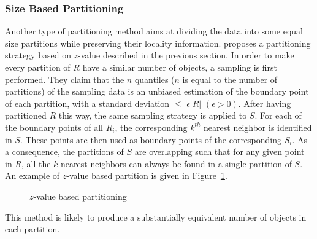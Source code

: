 \subsubsection{Size Based Partitioning} 

Another type of partitioning method aims at dividing the data into some equal size partitions while preserving their locality 
information. \cite{Zhang:2012:EPK:2247596.2247602} proposes a partitioning strategy based on $z$-value described in the 
previous section. 
In 
order to make every partition of $R$ have a similar number of objects, a sampling is first performed. They claim that the $n$ quantiles 
($n$ is equal to the number of partitions) of the sampling data is an unbiased estimation of the boundary point of each partition, with a
standard deviation $\leq$ $\epsilon\left|R\right|$ $\left( \epsilon > 0\right)$.
After having partitioned $R$ this way, the same sampling strategy is applied to $S$. For each of the boundary points 
of all $R_i$, the corresponding $k^{th}$ nearest neighbor is identified in $S$. These points are then used as boundary points of the corresponding $S_i$.
As a consequence, the partitions of $S$ are overlapping such that for any given point in $R$, all the $k$ nearest neighbors can always be found in a 
single partition of $S$. An example of $z$-value based partition is  given in Figure~\ref{projection_partition_figure}.
\begin{figure}[t]
\centering
{}
\caption{$z$-value based partitioning \label{projection_partition_figure}}
\end{figure}
This method is likely to produce a substantially equivalent number of objects in each partition. 

